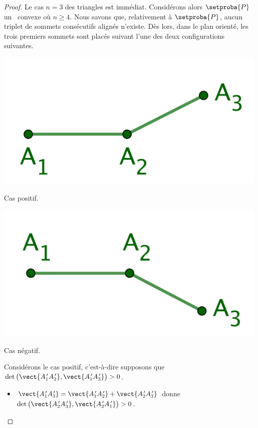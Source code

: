\begin{proof}
	Le cas $n = 3$ des triangles est immédiat.
	Considérons alors $\setproba{P}$ un \ngone\ convexe où  $n \geq 4$.
	Nous savons que, relativement à $\setproba{P}$, aucun triplet de sommets consécutifs alignés n'existe.
	Dès lors, dans le plan orienté, les trois premiers sommets sont placés suivant l'une des deux configurations suivantes. 
    
    \begin{multicols}{2}
        \small\itshape\centering
       	\includegraphics[scale=.45]{content/polygon/at-least-one/conv-det-sign-1.png}
    	    
    	\smallskip
        Cas positif.
        
        \includegraphics[scale=.45]{content/polygon/at-least-one/conv-det-sign-2.png}
    	    
    	\smallskip
        Cas négatif.
    \end{multicols}

    
    \newpage


    \noindent
    Considérons le cas positif, c'est-à-dire supposons que 
    $\det \big( \vect{\primeit{A}_1 \primeit{A}_2}, \vect{\primeit{A}_1 \primeit{A}_3} \big) > 0$.
	\begin{itemize}
    	\item $\vect{\primeit{A}_1 \primeit{A}_3} = \vect{\primeit{A}_1 \primeit{A}_2} + \vect{\primeit{A}_2 \primeit{A}_3}$
    	donne
		$\det \big( \vect{\primeit{A}_2 \primeit{A}_3}, \vect{\primeit{A}_2 \primeit{A}_1} \big) > 0$.



\end{itemize}
\end{proof}
